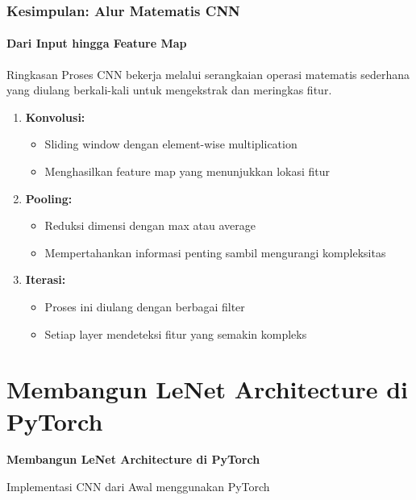 \documentclass[t,aspectratio=169,xcolor=dvipsnames]{beamer}
\begin{document}
\begin{frame}
    \frametitle{Kesimpulan: Alur Matematis CNN}
    \framesubtitle{Dari Input hingga Feature Map}
    \small

    \begin{block}{Ringkasan Proses}
        CNN bekerja melalui serangkaian operasi matematis sederhana yang diulang berkali-kali untuk mengekstrak dan meringkas fitur.
    \end{block}

    \begin{enumerate}
        \item \textbf{Konvolusi:} 
        \begin{itemize}
            \item Sliding window dengan element-wise multiplication
            \item Menghasilkan feature map yang menunjukkan lokasi fitur
        \end{itemize}
        
        \item \textbf{Pooling:}
        \begin{itemize}
            \item Reduksi dimensi dengan max atau average
            \item Mempertahankan informasi penting sambil mengurangi kompleksitas
        \end{itemize}
        
        \item \textbf{Iterasi:}
        \begin{itemize}
            \item Proses ini diulang dengan berbagai filter
            \item Setiap layer mendeteksi fitur yang semakin kompleks
        \end{itemize}
    \end{enumerate}

\end{frame}




\section{Membangun LeNet Architecture di PyTorch}

\begin{frame}[plain]
    \begin{center}
        \vspace{3cm}
        {\Huge \textbf{Membangun LeNet Architecture di PyTorch}}
        \vspace{0.5cm}
        
        {\large Implementasi CNN dari Awal menggunakan PyTorch}
    \end{center}
\end{frame}
\end{document}

